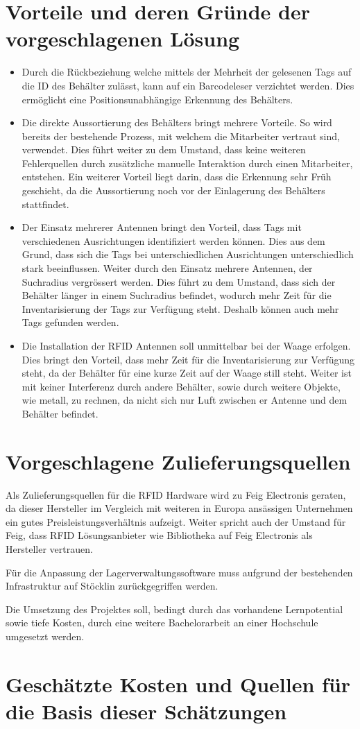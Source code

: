 \section{Vorteile und deren Gründe der vorgeschlagenen Lösung}
\begin{itemize}
	\item Durch die Rückbeziehung welche mittels der Mehrheit der gelesenen Tags auf die ID des Behälter zulässt, kann auf ein Barcodeleser verzichtet werden. Dies ermöglicht eine Positionsunabhängige Erkennung des Behälters.
	\item Die direkte Aussortierung des Behälters bringt mehrere Vorteile. So wird bereits der bestehende Prozess, mit welchem die Mitarbeiter vertraut sind, verwendet. Dies führt weiter zu dem Umstand, dass keine weiteren Fehlerquellen durch zusätzliche manuelle Interaktion durch einen Mitarbeiter, entstehen. Ein weiterer Vorteil liegt darin, dass die Erkennung sehr Früh geschieht, da die Aussortierung noch vor der Einlagerung des Behälters stattfindet.
	\item Der Einsatz mehrerer Antennen bringt den Vorteil, dass Tags mit verschiedenen Ausrichtungen identifiziert werden können. Dies aus dem Grund, dass sich die Tags bei unterschiedlichen Ausrichtungen unterschiedlich stark beeinflussen. Weiter durch den Einsatz mehrere Antennen, der Suchradius vergrössert werden. Dies führt zu dem Umstand, dass sich der Behälter länger in einem Suchradius befindet, wodurch mehr Zeit für die Inventarisierung der Tags zur Verfügung steht. Deshalb können auch mehr Tags gefunden werden.
	\item Die Installation der RFID Antennen soll unmittelbar bei der Waage erfolgen. Dies bringt den Vorteil, dass mehr Zeit für die Inventarisierung zur Verfügung steht, da der Behälter für eine kurze Zeit auf der Waage still steht. Weiter ist mit keiner Interferenz durch andere Behälter, sowie durch weitere Objekte, wie metall, zu rechnen, da nicht sich nur Luft zwischen er Antenne und dem Behälter befindet.
\end{itemize}


\section{Vorgeschlagene Zulieferungsquellen}
Als Zulieferungsquellen für die RFID Hardware wird zu Feig Electronis geraten, da dieser Hersteller im Vergleich mit weiteren in Europa ansässigen Unternehmen ein gutes Preisleistungsverhältnis aufzeigt. Weiter spricht auch der Umstand für Feig, dass RFID Lösungsanbieter wie Bibliotheka auf Feig Electronis als Hersteller vertrauen.

Für die Anpassung der Lagerverwaltungssoftware muss aufgrund der bestehenden Infrastruktur auf Stöcklin zurückgegriffen werden.

Die Umsetzung des Projektes soll, bedingt durch das vorhandene Lernpotential sowie tiefe Kosten, durch eine weitere Bachelorarbeit an einer Hochschule umgesetzt werden.

\section{Geschätzte Kosten und Quellen für die Basis dieser Schätzungen}

